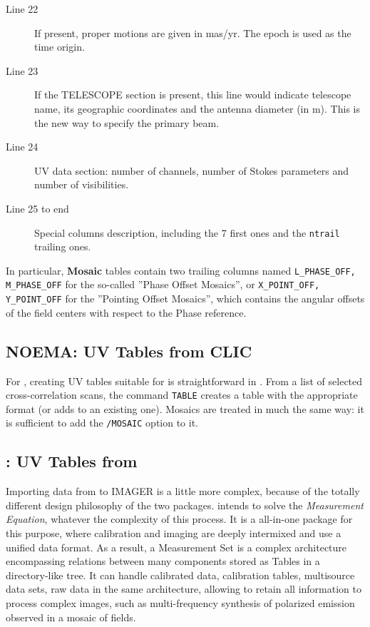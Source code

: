 \begin{description}
\item[Line 22] If present, proper motions are given in mas/yr. The epoch
is used as the time origin.
\item[Line 23] If the TELESCOPE section is present, this line would 
indicate telescope name, its geographic coordinates and the antenna 
diameter (in m). This is the new way to specify the primary beam.
\item[Line 24] UV data section: number of channels, number of Stokes
parameters and number of visibilities.
\item[Line 25 to end] Special columns description, including
the 7 first ones and the \texttt{ntrail} trailing ones.
\end{description}
In particular, \textbf{Mosaic} \uv{} tables contain two trailing 
columns named \texttt{L\_PHASE\_OFF, M\_PHASE\_OFF}
for the so-called ''Phase Offset Mosaics'', or 
\texttt{X\_POINT\_OFF, Y\_POINT\_OFF} for the ''Pointing Offset Mosaics'',
which contains the angular offsets of the field centers with respect
to the Phase reference. 

\subsection{NOEMA: UV Tables from CLIC}
\label{uv:clic}

For \NOEMA{}, creating UV tables suitable for \imager{} is straightforward
in \clic{}. From a list of selected cross-correlation scans, the command 
\texttt{TABLE} creates a  \uv{} table with the appropriate format
(or adds to an existing one). Mosaics are treated in much the same way:
it is sufficient to add the \texttt{/MOSAIC} option to it.

\subsection{\ALMA : UV Tables from \casa{}}
\label{uv:casa}

Importing \uv{} data from \casa{} to IMAGER is a little more complex, because
of the totally different design philosophy of the two packages.
\casa{} intends to solve the \textit{Measurement Equation}, whatever the
complexity of this process.  It is a all-in-one package for this purpose,
where calibration and imaging are deeply intermixed and use a
unified data format.
As a result, a \casa{} Measurement Set is a complex architecture
encompassing relations between many components stored as Tables
in a directory-like tree. It can handle calibrated data, calibration
tables, multisource data sets, raw data in the same architecture,
allowing to retain all information to process complex images, such
as multi-frequency synthesis of polarized emission observed in
a mosaic of fields.

